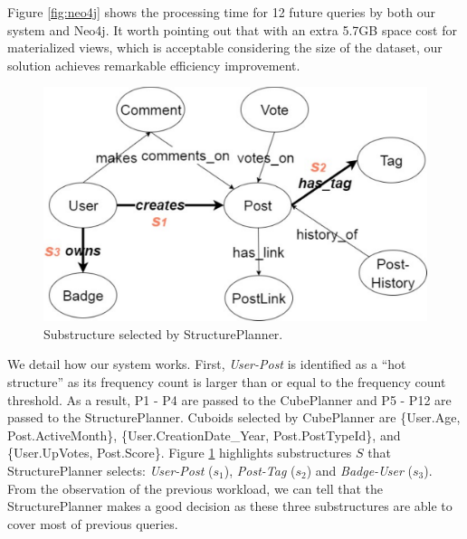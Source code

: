 Figure \ref{fig:neo4j} shows the processing time for 12 future queries by both our system and Neo4j. It worth pointing out that with an extra 5.7GB space cost for materialized views, which is acceptable considering the size of the dataset, our solution achieves remarkable efficiency improvement.

\begin{figure}[H]
	\centering
	\includegraphics[scale=0.5]{"pic/MetaSExp"}
	\caption{Substructure selected by StructurePlanner.}
	\label{fig:metagraphexperimenthot}
\end{figure}

We detail how our system works. First, \textit{User-Post} is identified as a ``hot structure'' as its frequency count is larger than or equal to the frequency count threshold. As a result, P1 - P4 are passed to the CubePlanner and P5 - P12 are passed to the StructurePlanner. Cuboids selected by CubePlanner are \{User.Age, Post.ActiveMonth\}, \{User.CreationDate\_Year, Post.PostTypeId\}, and \{User.UpVotes, Post.Score\}. Figure \ref{fig:metagraphexperimenthot} highlights substructures $S$ that StructurePlanner selects:  \textit{User-Post} ($s_1$), \textit{Post-Tag} ($s_2$) and \textit{Badge-User} ($s_3$). From the observation of the previous workload, we can tell that the StructurePlanner makes a good decision as these three substructures are able to cover most of previous queries. 

